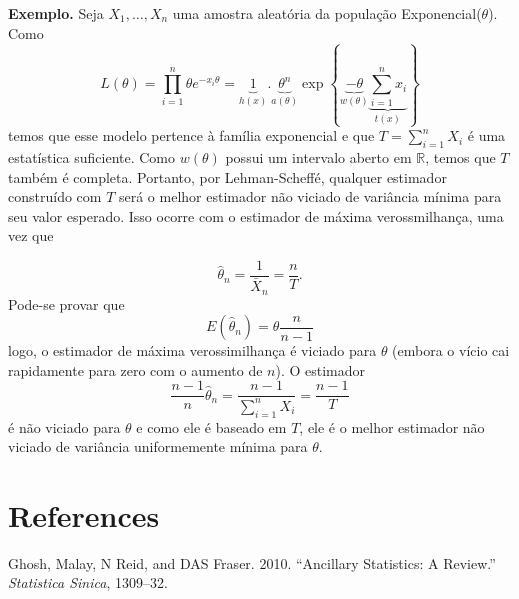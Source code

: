 \documentclass[
  letterpaper,
  DIV=11,
  numbers=noendperiod]{scrartcl}
\newlength{\cslhangindent}
\newenvironment{CSLReferences}[2] %
 {\begin{list}{}{%
  \setlength{\itemindent}{0pt}
  \setlength{\leftmargin}{0pt}
  \setlength{\parsep}{0pt}
  \ifodd #1
   \setlength{\leftmargin}{\cslhangindent}
   \setlength{\itemindent}{-1\cslhangindent}
  \fi
  \setlength{\itemsep}{#2\baselineskip}}}
 {\end{list}}
\begin{document}
\textbf{Exemplo.} Seja \(X_1,\ldots,X_n\) uma amostra aleatória da
população Exponencial(\(\theta\)). Como
\[L(\theta)=\prod_{i=1}^n \theta e^{-x_i\theta}=\underbrace{1}_{h(x)}.\underbrace{\theta^n}_{a(\theta)} \exp\left\{\underbrace{-\theta}_{w(\theta)}\underbrace{\sum_{i=1}^n x_i}_{t(x)}\right\}\]
temos que esse modelo pertence à família exponencial e que
\(T=\sum_{i=1}^nX_i\) é uma estatística suficiente. Como \(w(\theta)\)
possui um intervalo aberto em \(\mathbb{R}\), temos que \(T\) também é
completa. Portanto, por Lehman-Scheffé, qualquer estimador construído
com \(T\) será o melhor estimador não viciado de variância mínima para
seu valor esperado. Isso ocorre com o estimador de máxima
verossmilhança, uma vez que

\[\hat{\theta}_n=\frac{1}{\bar{X}_n}=\frac{n}{T}.\] Pode-se provar que
\[E(\hat{\theta}_n)=\theta\frac{n}{n-1}\] logo, o estimador de máxima
verossimilhança é viciado para \(\theta\) (embora o vício cai
rapidamente para zero com o aumento de \(n\)). O estimador
\[\frac{n-1}{n}\hat{\theta}_n=\frac{n-1}{\sum_{i=1}^n X_i}=\frac{n-1}{T}\]
é não viciado para \(\theta\) e como ele é baseado em \(T\), ele é o
melhor estimador não viciado de variância uniformemente mínima para
\(\theta\).


\chapter*{References}\label{references}


\label{refs}
\begin{CSLReferences}{1}{0}
Ghosh, Malay, N Reid, and DAS Fraser. 2010. {``Ancillary Statistics: A
Review.''} \emph{Statistica Sinica}, 1309--32.

\end{CSLReferences}
\end{document}
